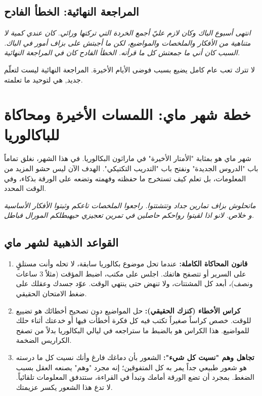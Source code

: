 \documentclass[12pt,a4paper]{book}
\newcommand{\quoteAr}[1]{%
	\begin{myquote}
		\itshape #1
	\end{myquote}
}
\begin{document}
	
	\subsection{المراجعة النهائية: الخطأ الفادح}
	
	\quoteAr{انتهى أسبوع الباك وكان لازم عليّ أجمع الخردة التي تركتها ورائي. كان عندي كمية لا متناهية من الأفكار والملخصات والمواضيع، لكن ما أجبتش على بزاف أمور في الباك. السبب كان أني ما جمعتش كل ما قرأته. الخطأ الفادح كان في المراجعة النهائية.}
	
	 لا تترك تعب عام كامل يضيع بسبب فوضى الأيام الأخيرة. المراجعة النهائية ليست لتعلّم جديد, هي لتوحيد ما تعلمته.
	
	
	
	\section{خطة شهر ماي: اللمسات الأخيرة ومحاكاة للباكالوريا}
	
	شهر ماي هو بمثابة "الأمتار الأخيرة" في ماراثون البكالوريا. في هذا الشهر، نغلق تماماً باب "الدروس الجديدة" ونفتح باب "التدريب التكتيكي". الهدف الآن ليس حشو المزيد من المعلومات، بل تعلم كيف تستخرج ما حفظته وفهمته وتضعه على الورقة بذكاء، وفي الوقت المحدد.
	
	\quoteAr{ماتحلوش بزاف تمارين جداد وتتشتتوا. راجعوا الملخصات تاعكم وثبتوا الأفكار الأساسية و خلاص. لانو اذا لقيتوا رواحكم حاصلين في تمرين تعجيزي حيهبطلكم المورال فباطل.}
	
	\subsection{القواعد الذهبية لشهر ماي}
	\begin{enumerate}
		\item \textbf{قانون المحاكاة الكاملة:} عندما تحل موضوع بكالوريا سابقة، لا تحله وأنت مستلقٍ على السرير أو تتصفح هاتفك. اجلس على مكتب، اضبط المؤقت (مثلاً 3 ساعات ونصف)، أبعد كل المشتتات، ولا تنهض حتى ينتهي الوقت. عوّد جسدك وعقلك على ضغط الامتحان الحقيقي.
		\item \textbf{كراس الأخطاء (كنزك الحقيقي):} حل المواضيع دون تصحيح أخطائك هو تضييع للوقت. خصص كراساً صغيراً تكتب فيه كل فكرة أخطأت فيها أو خدعتك أثناء حلك للمواضيع. هذا الكراس هو بالضبط ما ستراجعه في ليالي البكالوريا بدلاً من تصفح الكراريس الضخمة.
		\item \textbf{تجاهل وهم "نسيت كل شيء":} الشعور بأن دماغك فارغ وأنك نسيت كل ما درسته هو شعور طبيعي جداً يمر به كل المتفوقين؛ إنه مجرد "وهم" يصنعه العقل بسبب الضغط. بمجرد أن تضع الورقة أمامك وتبدأ في القراءة، ستتدفق المعلومات تلقائياً. لا تدع هذا الشعور يكسر عزيمتك.
	\end{enumerate}
	
\end{document}
